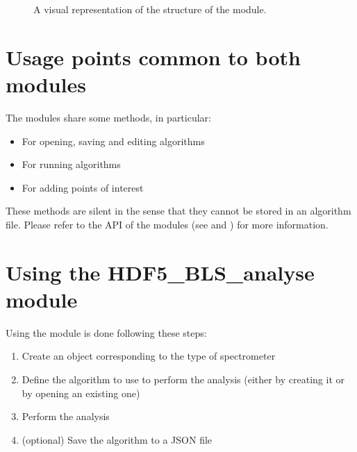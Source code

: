 \documentclass[letterpaper,10pt,english]{sphinxmanual}
\begin{document}
\begin{figure}[htbp]
\centering
\capstart

\noindent{}
\caption{A visual representation of the structure of the  module.}\label{\detokenize{source/data_processing:id2}}\end{figure}


\section{Usage points common to both modules}
\label{\detokenize{source/data_processing:usage-points-common-to-both-modules}}
\sphinxAtStartPar
The modules share some methods, in particular:
\begin{itemize}
\item {} 
\sphinxAtStartPar
For opening, saving and editing algorithms

\item {} 
\sphinxAtStartPar
For running algorithms

\item {} 
\sphinxAtStartPar
For adding points of interest

\end{itemize}

\sphinxAtStartPar
These methods are silent in the sense that they cannot be stored in an algorithm file. Please refer to the API of the modules (see {\hyperref[\detokenize{source/summary_HDF5_BLS_analyse:api-analyse}]{}} and {\hyperref[\detokenize{source/summary_HDF5_BLS_treat:api-treat}]{}}) for more information.


\section{Using the HDF5\_BLS\_analyse module}
\label{\detokenize{source/data_processing:using-the-hdf5-bls-analyse-module}}
\sphinxAtStartPar
Using the  module is done following these steps:
\begin{enumerate}
%
\item {} 
\sphinxAtStartPar
Create an object corresponding to the type of spectrometer

\item {} 
\sphinxAtStartPar
Define the algorithm to use to perform the analysis (either by creating it or by opening an existing one)

\item {} 
\sphinxAtStartPar
Perform the analysis

\item {} 
\sphinxAtStartPar
(optional) Save the algorithm to a JSON file

\end{enumerate}
\end{document}
